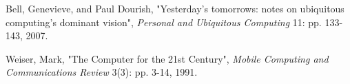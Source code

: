 \begin{thebibliography}{9}

        Bell, Genevieve, and Paul Dourish,
        "Yesterday's tomorrows: notes on ubiquitous computing's dominant vision",
        \emph{Personal and Ubiquitous Computing} 11: pp. 133-143,
        2007.
        
        Weiser, Mark,
        "The Computer for the 21st Century",
        \emph{Mobile Computing and Communications Review} 3(3): pp. 3-14,
        1991.
 
\end{thebibliography}